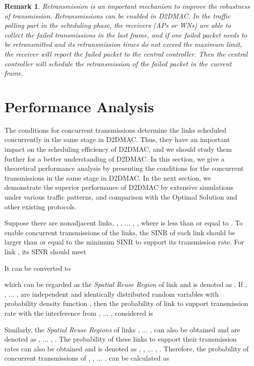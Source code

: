\documentclass[journal]{IEEEtran}
\newtheorem{remark}{Remark}
\begin{document}
\begin{remark}
Retransmission is an important mechanism to improve the robustness of transmission. Retransmissions can be enabled in D2DMAC. In the traffic polling part in the scheduling phase, the receivers (APs or WNs) are able to collect the failed transmissions in the last frame, and if one failed packet needs to be retransmitted and its retransmission times do not exceed the maximum limit, the receiver will report the failed packet to the central controller. Then the central controller will schedule the retransmission of the failed packet in the current frame.



\end{remark}


\section{Performance Analysis}\label{S5-i}

The conditions for concurrent transmissions determine the links scheduled concurrently in the same stage in D2DMAC. Thus, they have an important impact on the scheduling efficiency of D2DMAC, and we should study them further for a
better understanding of D2DMAC. In this section, we give a theoretical performance analysis by
presenting the conditions for the concurrent transmissions in the same stage in D2DMAC. In the next section, we demonstrate the superior performance of D2DMAC by extensive simulations under various traffic patterns, and comparison with the Optimal Solution and other existing protocols.




Suppose there are  nonadjacent links, , , ... , ,
where  is less than or equal to  \cite{mao}. To enable concurrent
transmissions of the  links, the SINR of each link should be larger than or equal to the minimum
SINR to support its transmission rate. For link , its SINR should meet

It can be converted to

which can be regarded as the \emph{Spatial Reuse Region} of link  and is denoted as
. If , , ... ,  are
independent and identically distributed random variables with probability density function ,
then the probability of link  to support transmission rate  with
the interference from , ... ,  considered is

Similarly, the \emph{Spatial Reuse Regions} of links , ... ,  can
also be obtained and are denoted as , ... , . The probability of these links to
support their transmission rates can also be obtained and is denoted as ,
, ... , . Therefore, the probability of concurrent
transmissions of , , ... ,  can be calculated as
\end{document}
